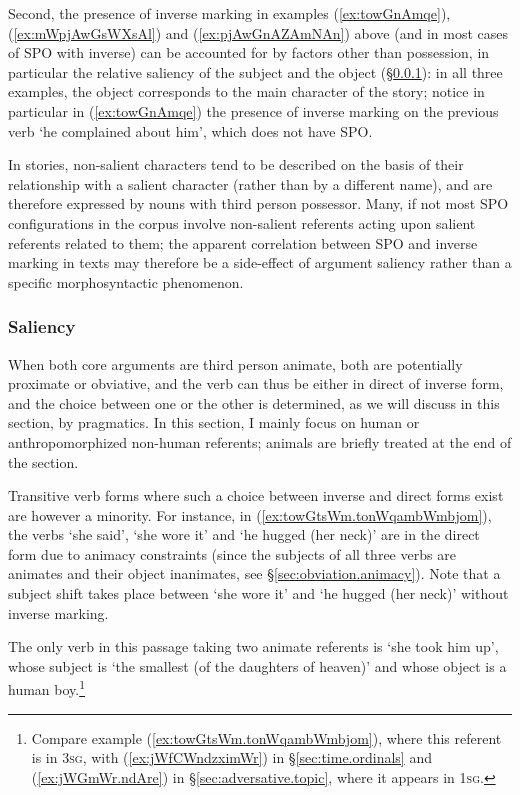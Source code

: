 Second, the presence of inverse marking in examples (\ref{ex:towGnAmqe}), (\ref{ex:mWpjAwGsWXsAl}) and (\ref{ex:pjAwGnAZAmNAn}) above (and in most cases of SPO with inverse) can be accounted for by factors other than possession, in particular the relative saliency of the subject and the object (§\ref{sec:obviation.saliency}): in all three examples, the object corresponds to the main character of the story; notice in particular in (\ref{ex:towGnAmqe}) the presence of inverse marking on the previous verb  `he complained about him', which does not have SPO. 

In stories, non-salient characters tend to be described on the basis of their relationship with a salient character (rather than by a different name), and are therefore expressed by nouns with third person possessor. Many, if not most SPO configurations in the corpus involve non-salient referents acting upon salient referents related to them; the apparent correlation between SPO and inverse marking in texts may therefore be a side-effect of argument saliency rather than a specific morphosyntactic phenomenon.


\subsubsection{Saliency}  \label{sec:obviation.saliency}
When both core arguments are third person animate, both are potentially proximate or obviative, and the verb can thus be either in direct of inverse form, and the choice between one or the other is determined, as we will discuss in this section, by pragmatics. In this section, I mainly focus on human or anthropomorphized non-human referents; animals are briefly treated at the end of the section.

Transitive verb forms where such a choice between inverse and direct forms exist are however a minority. For instance, in  (\ref{ex:towGtsWm.tonWqambWmbjom}), the verbs  `she said',  `she wore it' and  `he hugged (her neck)' are in the direct form due to animacy constraints (since the subjects of all three verbs are animates and their object inanimates, see §\ref{sec:obviation.animacy}). Note that a subject shift takes place between   `she wore it' and  `he hugged (her neck)' without inverse marking.

The only verb in this passage taking two animate referents is  `she took him up', whose subject is  `the smallest (of the daughters of heaven)' and whose object is a human boy.\footnote{Compare example (\ref{ex:towGtsWm.tonWqambWmbjom}), where this referent is in \textsc{3sg}, with (\ref{ex:jWfCWndzximWr}) in §\ref{sec:time.ordinals} and (\ref{ex:jWGmWr.ndAre}) in §\ref{sec:adversative.topic}, where it appears in \textsc{1sg}. }

